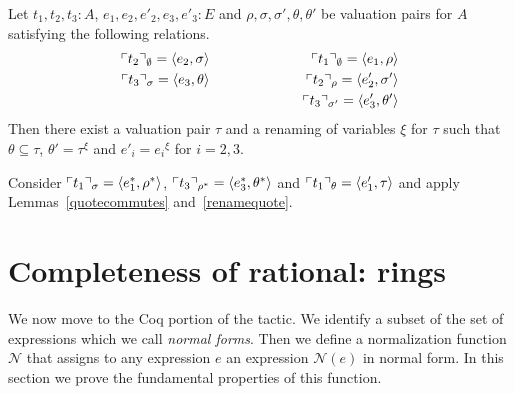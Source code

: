 \documentclass[numreferences]{kluwer}
\newcommand{\N}{\ensuremath{\mathcal{N}}}
\newcommand{\tacticname}[1]{\textsf{#1}}
\newcommand{\rational}{\tacticname{rational}}
\newcommand{\mlfn}[2]{\ensuremath\ulcorner{#1}\urcorner_{#2}}
\newcommand{\renamevar}[2]{\ensuremath{{#1}^{#2}}}
\newcommand{\isrenamevar}[3]{\ensuremath{{#1}=\renamevar{#2}{#3}}}
\begin{document}
\begin{article}
\begin{lemma}\label{quoteaddpred}
Let $t_1,t_2,t_3:A$, $e_1,e_2,e'_2,e_3,e'_3:E$ and
$\rho,\sigma,\sigma',\theta,\theta'$ be valuation pairs for $A$
satisfying the following relations.
\begin{eqnarray*}
\mlfn{t_2}{\emptyset} = \langle e_2,\sigma\rangle
 && \mlfn{t_1}{\emptyset} = \langle e_1,\rho\rangle\\
\mlfn{t_3}{\sigma} = \langle e_3,\theta\rangle
 && \mlfn{t_2}{\rho} = \langle e'_2,\sigma'\rangle\\
 &\hspace{2cm}&\mlfn{t_3}{\sigma'} = \langle e'_3,\theta'\rangle
\end{eqnarray*}
Then there exist a valuation pair $\tau$ and a renaming of variables
$\xi$ for $\tau$ such that $\theta\subseteq\tau$,
{\isrenamevar{\theta'}\tau\xi} and {\isrenamevar{e'_i}{e_i}\xi} for $i=2,3$.
\end{lemma}
\begin{pf}
Consider $\mlfn{t_1}{\sigma}=\langle e^\ast_1,\rho^\ast\rangle$,
$\mlfn{t_3}{\rho^\ast}=\langle e^\ast_3,\theta^\ast\rangle$ and
$\mlfn{t_1}{\theta}=\langle e'_1,\tau\rangle$
and apply Lemmas~\ref{quotecommutes} and~\ref{renamequote}.
\end{pf}

\section{Completeness of {\rational}: rings}\label{normalization}

We now move to the Coq portion of the tactic.
We identify a subset of the set of expressions which we call
\emph{normal forms}.  Then we define a normalization function {\N}
that assigns to any expression $e$ an expression $\N(e)$ in normal
form.  In this section we prove the fundamental properties of this function.


\end{article}
\end{document}
